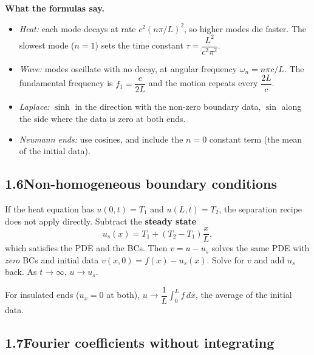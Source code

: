 \documentclass[11pt]{article}
\begin{document}
\begin{center}
\end{center}

\textbf{What the formulas say.}
\begin{itemize}
  \item \emph{Heat:} each mode decays at rate $c^2(n\pi/L)^2$, so higher modes die faster. The slowest mode ($n=1$) sets the time constant $\tau=\dfrac{L^2}{c^2\pi^2}$.
  \item \emph{Wave:} modes oscillate with no decay, at angular frequency $\omega_n=n\pi c/L$. The fundamental frequency is $f_1=\dfrac{c}{2L}$ and the motion repeats every $\dfrac{2L}{c}$.
  \item \emph{Laplace:} $\sinh$ in the direction with the non-zero boundary data, $\sin$ along the side where the data is zero at both ends.
  \item \emph{Neumann ends:} use cosines, and include the $n=0$ constant term (the mean of the initial data).
\end{itemize}

\subsection*{1.6\quad Non-homogeneous boundary conditions}

If the heat equation has $u(0,t)=T_1$ and $u(L,t)=T_2$, the separation recipe does not apply directly. Subtract the \textbf{steady state}
\[
u_s(x)=T_1+(T_2-T_1)\frac xL ,
\]
which satisfies the PDE and the BCs. Then $v=u-u_s$ solves the same PDE with \emph{zero} BCs and initial data $v(x,0)=f(x)-u_s(x)$. Solve for $v$ and add $u_s$ back. As $t\to\infty$, $u\to u_s$.

For insulated ends ($u_x=0$ at both), $u\to\dfrac1L\displaystyle\int_0^Lf\,dx$, the average of the initial data.

\subsection*{1.7\quad Fourier coefficients without integrating}
\end{document}
